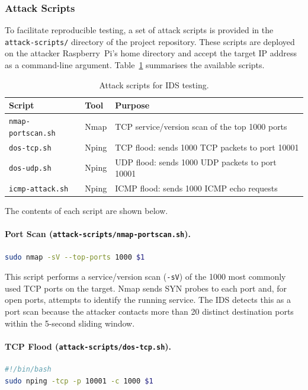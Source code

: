 \documentclass[12pt,a4paper]{article}
\begin{document}
\subsubsection{Attack Scripts}
\label{sec:attack_scripts}

To facilitate reproducible testing, a set of attack scripts is provided in the \texttt{attack-scripts/} directory of the project repository. These scripts are deployed on the attacker Raspberry~Pi's home directory and accept the target IP address as a command-line argument. Table~\ref{tab:attack_scripts} summarises the available scripts.

\begin{table}[H]
\centering
\caption{Attack scripts for IDS testing.}
\label{tab:attack_scripts}
\begin{tabular}{llp{5.5cm}}
\toprule
\textbf{Script} & \textbf{Tool} & \textbf{Purpose} \\
\midrule
\texttt{nmap-portscan.sh} & Nmap   & TCP service/version scan of the top 1000 ports \\
\texttt{dos-tcp.sh}       & Nping  & TCP flood: sends 1000 TCP packets to port 10001 \\
\texttt{dos-udp.sh}       & Nping  & UDP flood: sends 1000 UDP packets to port 10001 \\
\texttt{icmp-attack.sh}   & Nping  & ICMP flood: sends 1000 ICMP echo requests \\
\bottomrule
\end{tabular}
\end{table}

The contents of each script are shown below.

\paragraph{Port Scan (\texttt{attack-scripts/nmap-portscan.sh}).}
\begin{lstlisting}[language=bash]
sudo nmap -sV --top-ports 1000 $1
\end{lstlisting}

This script performs a service/version scan (\texttt{-sV}) of the 1000 most commonly used TCP ports on the target. Nmap sends SYN probes to each port and, for open ports, attempts to identify the running service. The IDS detects this as a port scan because the attacker contacts more than 20 distinct destination ports within the 5-second sliding window.

\paragraph{TCP Flood (\texttt{attack-scripts/dos-tcp.sh}).}
\begin{lstlisting}[language=bash]
#!/bin/bash
sudo nping -tcp -p 10001 -c 1000 $1
\end{lstlisting}
\end{document}
